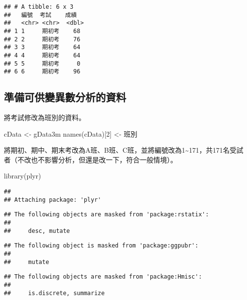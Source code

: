 \documentclass[
]{book}
\newenvironment{Shaded}{\begin{snugshade}}{\end{snugshade}}
\newcommand{\DecValTok}[1]{\textcolor[rgb]{0.00,0.00,0.81}{#1}}
\newcommand{\FunctionTok}[1]{\textcolor[rgb]{0.00,0.00,0.00}{#1}}
\newcommand{\NormalTok}[1]{#1}
\newcommand{\OtherTok}[1]{\textcolor[rgb]{0.56,0.35,0.01}{#1}}
\newcommand{\StringTok}[1]{\textcolor[rgb]{0.31,0.60,0.02}{#1}}
\begin{document}
\begin{verbatim}
## # A tibble: 6 x 3
##   編號  考試    成績
##   <chr> <chr>  <dbl>
## 1 1     期初考    68
## 2 2     期初考    76
## 3 3     期初考    64
## 4 4     期初考    64
## 5 5     期初考     0
## 6 6     期初考    96
\end{verbatim}

\hypertarget{ux6e96ux5099ux53efux4f9bux8b8aux7570ux6578ux5206ux6790ux7684ux8cc7ux6599-1}{%
\subsection{準備可供變異數分析的資料}\label{ux6e96ux5099ux53efux4f9bux8b8aux7570ux6578ux5206ux6790ux7684ux8cc7ux6599-1}}

將考試修改為班別的資料。

\begin{Shaded}
\begin{Highlighting}[]
\NormalTok{cData }\OtherTok{\textless{}{-}}\NormalTok{ gData3m}
\FunctionTok{names}\NormalTok{(cData)[}\DecValTok{2}\NormalTok{] }\OtherTok{\textless{}{-}} \StringTok{\textquotesingle{}班別\textquotesingle{}}
\end{Highlighting}
\end{Shaded}

將期初、期中、期末考改為A班、B班、C班，並將編號改為1\textasciitilde171，共171名受試者（不改也不影響分析，但還是改一下，符合一般情境）。

\begin{Shaded}
\begin{Highlighting}[]
\FunctionTok{library}\NormalTok{(plyr)}
\end{Highlighting}
\end{Shaded}

\begin{verbatim}
## 
## Attaching package: 'plyr'
\end{verbatim}

\begin{verbatim}
## The following objects are masked from 'package:rstatix':
## 
##     desc, mutate
\end{verbatim}

\begin{verbatim}
## The following object is masked from 'package:ggpubr':
## 
##     mutate
\end{verbatim}

\begin{verbatim}
## The following objects are masked from 'package:Hmisc':
## 
##     is.discrete, summarize
\end{verbatim}
\end{document}
